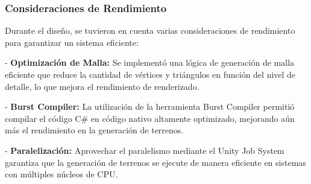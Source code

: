 \subsubsection{Consideraciones de Rendimiento}

Durante el diseño, se tuvieron en cuenta varias consideraciones de rendimiento para garantizar un sistema eficiente:

- \textbf{Optimización de Malla:} Se implementó una lógica de generación de malla eficiente que reduce la cantidad de vértices y triángulos en función del nivel de detalle, lo que mejora el rendimiento de renderizado.

- \textbf{Burst Compiler:} La utilización de la herramienta Burst Compiler permitió compilar el código C\# en código nativo altamente optimizado, mejorando aún más el rendimiento en la generación de terrenos.

- \textbf{Paralelización:} Aprovechar el paralelismo mediante el Unity Job System garantiza que la generación de terrenos se ejecute de manera eficiente en sistemas con múltiples núcleos de CPU.








